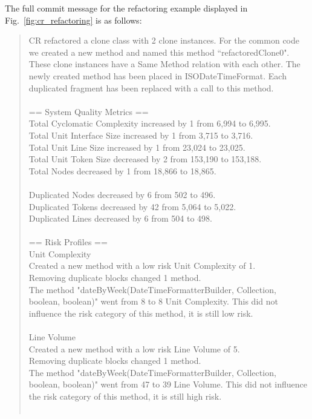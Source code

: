 \documentclass[sigconf,review,anonymous]{acmart}
\begin{document}
The full commit message for the refactoring example displayed in Fig.~\ref{fig:cr_refactoring} is as follows:
\begin{quote}
CR refactored a clone class with 2 clone instances. For the common code we created a new method and named this method “refactoredClone0". These clone instances have a Same Method relation with each other. The newly created method has been placed in ISODateTimeFormat. Each duplicated fragment has been replaced with a call to this method.
\\ \\
== System Quality Metrics == \\
Total Cyclomatic Complexity increased by 1 from 6,994 to 6,995.\\
Total Unit Interface Size increased by 1 from 3,715 to 3,716.\\
Total Unit Line Size increased by 1 from 23,024 to 23,025.\\
Total Unit Token Size decreased by 2 from 153,190 to 153,188.\\
Total Nodes decreased by 1 from 18,866 to 18,865.\\
\\
Duplicated Nodes decreased by 6 from 502 to 496.\\
Duplicated Tokens decreased by 42 from 5,064 to 5,022.\\
Duplicated Lines decreased by 6 from 504 to 498.\\
\\
== Risk Profiles ==\\
Unit Complexity\\
Created a new method with a low risk Unit Complexity of 1.\\
Removing duplicate blocks changed 1 method.\\
The method "dateByWeek(DateTimeFormatterBuilder, Collection, boolean, boolean)" went from 8 to 8 Unit Complexity. This did not influence the risk category of this method, it is still low risk.\\
\\
Line Volume\\
Created a new method with a low risk Line Volume of 5.\\
Removing duplicate blocks changed 1 method.\\
The method "dateByWeek(DateTimeFormatterBuilder, Collection, boolean, boolean)" went from 47 to 39 Line Volume. This did not influence the risk category of this method, it is still high risk.\\
\\

\end{quote}
\end{document}
